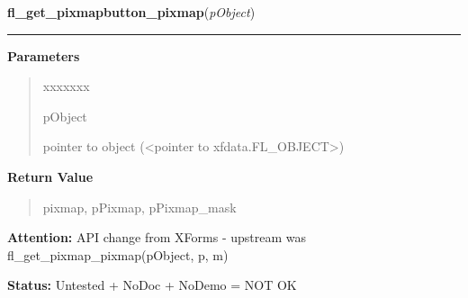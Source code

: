 \hspace{.8\funcindent}\begin{boxedminipage}{\funcwidth}

    \raggedright \textbf{fl\_get\_pixmapbutton\_pixmap}(\textit{pObject})

    \vspace{-1.5ex}

    \rule{\textwidth}{0.5\fboxrule}
\setlength{\parskip}{2ex}
\setlength{\parskip}{1ex}
      \textbf{Parameters}
      \vspace{-1ex}

      \begin{quote}
        \begin{Ventry}{xxxxxxx}

          \item[pObject]

          pointer to object ({\textless}pointer to 
          xfdata.FL\_OBJECT{\textgreater})

        \end{Ventry}

      \end{quote}

      \textbf{Return Value}
    \vspace{-1ex}

      \begin{quote}
      pixmap, pPixmap, pPixmap\_mask

      \end{quote}

\textbf{Attention:} API change from XForms - upstream was fl\_get\_pixmap\_pixmap(pObject, p, 
m)



\textbf{Status:} Untested + NoDoc + NoDemo = NOT OK



    \end{boxedminipage}

    \label{xformslib:library:fl_read_pixmapfile}

    \vspace{0.5ex}

